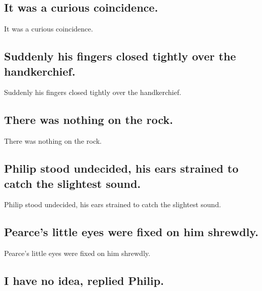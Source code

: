 \documentclass[]{article}
\begin{document}
\hypertarget{it-was-a-curious-coincidence.}{%
\subsection{It was a curious
coincidence.}\label{it-was-a-curious-coincidence.}}

It was a curious coincidence.

\hypertarget{suddenly-his-fingers-closed-tightly-over-the-handkerchief.}{%
\subsection{Suddenly his fingers closed tightly over the
handkerchief.}\label{suddenly-his-fingers-closed-tightly-over-the-handkerchief.}}

Suddenly his fingers closed tightly over the handkerchief.

\hypertarget{there-was-nothing-on-the-rock.}{%
\subsection{There was nothing on the
rock.}\label{there-was-nothing-on-the-rock.}}

There was nothing on the rock.

\hypertarget{philip-stood-undecided-his-ears-strained-to-catch-the-slightest-sound.}{%
\subsection{Philip stood undecided, his ears strained to catch the
slightest
sound.}\label{philip-stood-undecided-his-ears-strained-to-catch-the-slightest-sound.}}

Philip stood undecided, his ears strained to catch the slightest sound.

\hypertarget{pearces-little-eyes-were-fixed-on-him-shrewdly.}{%
\subsection{Pearce's little eyes were fixed on him
shrewdly.}\label{pearces-little-eyes-were-fixed-on-him-shrewdly.}}

Pearce's little eyes were fixed on him shrewdly.

\hypertarget{i-have-no-idea-replied-philip.}{%
\subsection{I have no idea, replied
Philip.}\label{i-have-no-idea-replied-philip.}}
\end{document}
